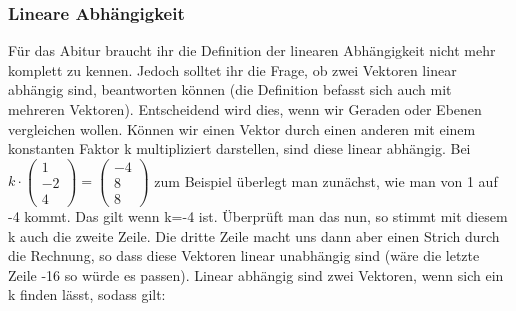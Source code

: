 	\subsubsection{Lineare Abhängigkeit}
		Für das Abitur braucht ihr die Definition der linearen Abhängigkeit nicht mehr
		komplett zu kennen. Jedoch solltet ihr die Frage, ob zwei Vektoren linear
		abhängig sind, beantworten können (die Definition befasst sich auch mit
		mehreren Vektoren). Entscheidend wird dies, wenn wir Geraden oder Ebenen
		vergleichen wollen. Können wir einen Vektor durch einen anderen mit einem
		konstanten Faktor k multipliziert darstellen, sind diese linear abhängig. Bei
		\(k\cdot \begin{pmatrix} 1\\
		 -2\\
		 4
		\end{pmatrix}=\begin{pmatrix}
		 -4\\
		 8\\
		 8
		\end{pmatrix}\)
		zum Beispiel überlegt man zunächst, wie man von 1 auf -4 kommt. Das gilt wenn
		k=-4 ist. Überprüft man das nun, so stimmt mit diesem k auch die zweite Zeile.
		Die dritte Zeile macht uns dann aber einen Strich durch die Rechnung, so dass
		diese Vektoren linear unabhängig sind (wäre die letzte Zeile -16 so würde es
		passen). Linear abhängig sind zwei Vektoren, wenn sich ein k finden lässt,
		sodass gilt:
		\\ \\
		\formel{\[\vec{a}=k\cdot \vec{b}\]}
